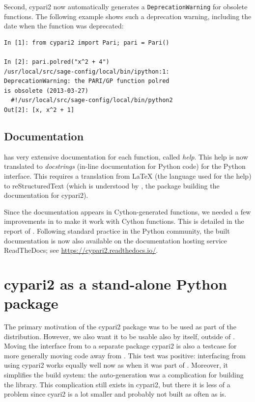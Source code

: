 \documentclass{deliverablereport}
\begin{document}
Second, cypari2 now automatically
generates a \texttt{DeprecationWarning}
for obsolete \PariGP functions.
The following example shows such a deprecation warning,
including the date when the function was deprecated:
\begin{verbatim}
In [1]: from cypari2 import Pari; pari = Pari()

In [2]: pari.polred("x^2 + 4")
/usr/local/src/sage-config/local/bin/ipython:1:
DeprecationWarning: the PARI/GP function polred
is obsolete (2013-03-27)
  #!/usr/local/src/sage-config/local/bin/python2
Out[2]: [x, x^2 + 1]
\end{verbatim}

\subsection{Documentation}

\PariGP has very extensive documentation for each function, called \emph{help}.
This help is now translated to \emph{docstrings}
(in-line documentation for Python code) for the Python interface.
This requires a translation from \LaTeX{}
(the language used for the \PariGP help)
to reStructuredText (which is understood by \Sphinx,
the package building the documentation for cypari2).

Since the documentation appears in Cython-generated functions,
we needed a few improvements in \Sphinx to make it work
with Cython functions.
This is detailed in the report of .
Following standard practice in the Python community,
the built documentation is now also available on the
documentation hosting service ReadTheDocs;
see \url{https://cypari2.readthedocs.io/}.

\section{cypari2 as a stand-alone Python package}

The primary motivation of the cypari2 package
was to be used as part of the \Sage distribution.
However, we also want it to be usable also by itself, outside of \Sage.
Moving the \PariGP interface from \Sage to a separate package cypari2
is also a testcase for more generally moving code away from \Sage.
This test was positive:
interfacing \PariGP from \Sage using cypari2 works equally well now
as when it was part of \Sage.
Moreover, it simplifies the \Sage build system:
the auto-generation was a complication for building the \Sage library.
This complication still exists in cypari2,
but there it is less of a problem since cyari2 is a lot smaller
and probably not built as often as \Sage is.
\end{document}
